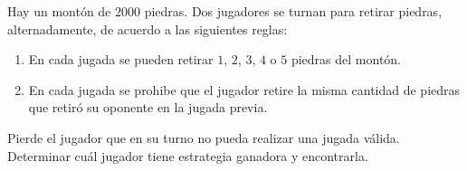 Hay un montón de $2000$ piedras. Dos jugadores se turnan para retirar piedras, alternadamente, de acuerdo a las siguientes reglas:
 \begin{enumerate} 
   \item  En cada jugada se pueden retirar $1$, $2$, $3$, $4$ o $5$ piedras del montón.
   \item  En cada jugada se prohibe que el jugador retire la misma cantidad de piedras que retiró su oponente en la jugada previa.
 \end{enumerate} 
Pierde el jugador que en su turno no pueda realizar una jugada válida. Determinar cuál jugador tiene estrategia ganadora y encontrarla.
